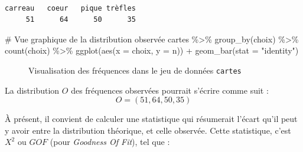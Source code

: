 \documentclass[
  letterpaper,
]{book}
\newenvironment{Shaded}{\begin{snugshade}}{\end{snugshade}}
\newcommand{\AttributeTok}[1]{\textcolor[rgb]{0.40,0.45,0.13}{#1}}
\newcommand{\CommentTok}[1]{\textcolor[rgb]{0.37,0.37,0.37}{#1}}
\newcommand{\FunctionTok}[1]{\textcolor[rgb]{0.28,0.35,0.67}{#1}}
\newcommand{\NormalTok}[1]{\textcolor[rgb]{0.00,0.23,0.31}{#1}}
\newcommand{\SpecialCharTok}[1]{\textcolor[rgb]{0.37,0.37,0.37}{#1}}
\newcommand{\StringTok}[1]{\textcolor[rgb]{0.13,0.47,0.30}{#1}}
\begin{document}
\begin{verbatim}

carreau   coeur   pique trèfles 
     51      64      50      35 
\end{verbatim}

\begin{Shaded}
\begin{Highlighting}[]
\CommentTok{\# Vue graphique de la distribution observée}
\NormalTok{cartes }\SpecialCharTok{\%\textgreater{}\%} 
  \FunctionTok{group\_by}\NormalTok{(choix) }\SpecialCharTok{\%\textgreater{}\%} 
  \FunctionTok{count}\NormalTok{(choix) }\SpecialCharTok{\%\textgreater{}\%} 
  \FunctionTok{ggplot}\NormalTok{(}\FunctionTok{aes}\NormalTok{(}\AttributeTok{x =}\NormalTok{ choix, }\AttributeTok{y =}\NormalTok{ n)) }\SpecialCharTok{+} 
  \FunctionTok{geom\_bar}\NormalTok{(}\AttributeTok{stat =} \StringTok{"identity"}\NormalTok{)}
\end{Highlighting}
\end{Shaded}

\begin{figure}[H]


\caption{\label{fig-FreqCards}Visualisation des fréquences dans le jeu
de données \texttt{cartes}}

\end{figure}%

La distribution \(O\) des fréquences observées pourrait s'écrire comme
suit : \[O = (51, 64, 50, 35)\]

À présent, il convient de calculer une statistique qui résumerait
l'écart qu'il peut y avoir entre la distribution théorique, et celle
observée. Cette statistique, c'est \(X^2\) ou \(GOF\) (pour
\emph{Goodness Of Fit}), tel que :
\end{document}
